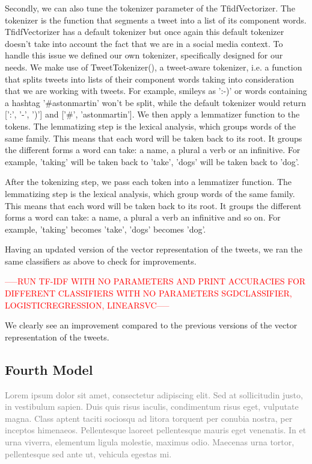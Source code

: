\documentclass[10pt,conference,compsocconf]{IEEEtran}
\begin{document}
Secondly, we can also tune the tokenizer parameter of the TfidfVectorizer. The tokenizer is the function that segments a tweet into a list of its component words. TfidfVectorizer has a default tokenizer but once again this default tokenizer doesn't take into account the fact that we are in a social media context. To handle this issue we defined our own tokenizer, specifically designed for our needs. We make use of TweetTokenizer(), a tweet-aware tokenizer, i.e. a function that splits tweets into lists of their component words taking into consideration that we are working with tweets. For example, smileys as ':-)' or words containing a hashtag '\#astonmartin' won't be split, while the default tokenizer would return [':', '-', ')'] and ['\#', 'astonmartin']. We then apply a lemmatizer function to the tokens. The lemmatizing step is the lexical analysis, which groups words of the same family. This means that each word will be taken back to its root. It groups the different forms a word can take: a name, a plural a verb or an infinitive. For example, 'taking' will be taken back to 'take', 'dogs' will be taken back to 'dog'.

After the tokenizing step, we pass each token into a lemmatizer function. The lemmatizing step is the lexical analysis, which group words of the same family. This means that each word will be taken back to its root. It groups the different forms a word can take: a name, a plural a verb an infinitive and so on. For example, 'taking' becomes 'take', 'dogs' becomes 'dog'.

Having an updated version of the vector representation of the tweets, we ran the same classifiers as above to check for improvements.

\begin{center}\textcolor{red}{-----RUN TF-IDF WITH NO PARAMETERS AND PRINT ACCURACIES FOR DIFFERENT CLASSIFIERS WITH NO PARAMETERS
SGDCLASSIFIER, LOGISTICREGRESSION, LINEARSVC-----}\end{center}

We clearly see an improvement compared to the previous versions of the vector representation of the tweets.

\subsection{Fourth Model}
\textcolor{gray}{Lorem ipsum dolor sit amet, consectetur adipiscing elit. Sed at sollicitudin justo, in vestibulum sapien. Duis quis risus iaculis, condimentum risus eget, vulputate magna. Class aptent taciti sociosqu ad litora torquent per conubia nostra, per inceptos himenaeos. Pellentesque laoreet pellentesque mauris eget venenatis. In et urna viverra, elementum ligula molestie, maximus odio. Maecenas urna tortor, pellentesque sed ante ut, vehicula egestas mi.}
\end{document}
